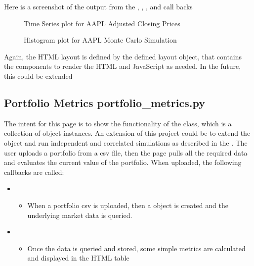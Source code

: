 \documentclass[letterpaper,10pt,english]{sphinxmanual}
\begin{document}
\sphinxAtStartPar
Here is a screenshot of the output from the , ,
, and  call backs

\begin{figure}[htbp]
\centering
\capstart

\noindent{}
\caption{Time Series plot for AAPL Adjusted Closing Prices}\label{\detokenize{dashapp_documentation:id1}}\end{figure}

\begin{figure}[htbp]
\centering
\capstart

\noindent{}
\caption{Histogram plot for AAPL Monte Carlo Simulation}\label{\detokenize{dashapp_documentation:id2}}\end{figure}

\sphinxAtStartPar
Again, the HTML layout is defined by the defined layout object, that
contains the  components to render the HTML and JavaScript as
needed. In the future, this could be extended


\subsection{Portfolio Metrics \sphinxhyphen{} portfolio\_metrics.py}
\label{\detokenize{dashapp_documentation:portfolio-metrics-portfolio-metrics-py}}
\sphinxAtStartPar
The intent for this page is to show the functionality of the
 class, which is a collection of  object
instances. An extension of this project could be to extend the object
and run independent and correlated simulations as described in the
.
The user uploads a portfolio from a csv file, then the page pulls all
the required data and evaluates the current value of the portfolio. When
uploaded, the following callbacks are called:
\begin{itemize}
\item {} 
\sphinxAtStartPar
{}
\begin{itemize}
\item {} 
\sphinxAtStartPar
When a portfolio csv is uploaded, then a  object is
created and the underlying market data is queried.

\end{itemize}

\item {} 
\sphinxAtStartPar
{}
\begin{itemize}
\item {} 
\sphinxAtStartPar
Once the data is queried and stored, some simple metrics are
calculated and displayed in the HTML table

\end{itemize}

\end{itemize}
\end{document}
